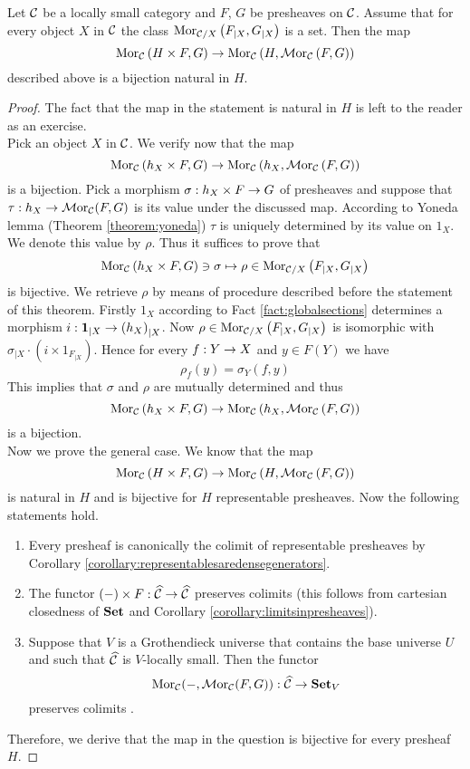 \begin{theorem}\label{theorem:internalhomforpresheaves}
Let ${\mathcal C}$ be a locally small category and $F$, $G$ be presheaves on ${\mathcal C}$. Assume that for every object $X$ in ${\mathcal C}$ the class $\mathrm{Mor}_{{\mathcal C}/X}\left(F_{\mid X},G_{\mid X}\right)$ is a set. Then the map 
$$\mathrm{Mor}_{{\mathcal C}}\left(H\times F,G\right)\rightarrow  \mathrm{Mor}_{{\mathcal C}}\left(H,\mathcal{M}\mathrm{or}_{{\mathcal C}}\left(F,G\right)\right)$$
described above is a bijection natural in $H$. 
\end{theorem}
\begin{proof}
The fact that the map in the statement is natural in $H$ is left to the reader as an exercise.\\
Pick an object $X$ in ${\mathcal C}$. We verify now that the map
$$\mathrm{Mor}_{{\mathcal C}}\left(h_X\times F,G\right)\rightarrow  \mathrm{Mor}_{{\mathcal C}}\left(h_X,\mathcal{M}\mathrm{or}_{{\mathcal C}}\left(F,G\right)\right)$$
is a bijection. Pick a morphism $\sigma:h_X\times F\rightarrow G$ of presheaves and suppose that $\tau:h_X\rightarrow \mathcal{M}\mathrm{or}_{{\mathcal C}}(F,G)$ is its value under the discussed map. According to Yoneda lemma (Theorem \ref{theorem:yoneda}) $\tau$ is uniquely determined by its value on $1_X$. We denote this value by $\rho$. Thus it suffices to prove that 
$$\mathrm{Mor}_{{\mathcal C}}\left(h_X\times F,G\right)\ni \sigma \mapsto \rho \in \mathrm{Mor}_{{\mathcal C}/X}\left(F_{\mid X},G_{\mid X}\right)$$
is bijective. We retrieve $\rho$ by means of procedure described before the statement of this theorem. Firstly $1_X$ according to Fact \ref{fact:globalsections} determines a morphism $i:\mathbf{1}_{\mid X}\rightarrow \left(h_X\right)_{\mid X}$. Now $\rho\in \mathrm{Mor}_{{\mathcal C}/X}\left(F_{\mid X},G_{\mid X}\right)$ is isomorphic with $\sigma_{\mid X}\cdot \left(i\times 1_{F_{\mid X}}\right)$. Hence for every $f:Y\rightarrow X$ and $y\in F(Y)$ we have 
$$\rho_f(y) = \sigma_Y(f,y)$$
This implies that $\sigma$ and $\rho$ are mutually determined and thus
$$\mathrm{Mor}_{{\mathcal C}}\left(h_X\times F,G\right)\rightarrow  \mathrm{Mor}_{{\mathcal C}}\left(h_X,\mathcal{M}\mathrm{or}_{{\mathcal C}}\left(F,G\right)\right)$$
is a bijection.\\
Now we prove the general case. We know that the map
$$\mathrm{Mor}_{{\mathcal C}}\left(H\times F,G\right)\rightarrow  \mathrm{Mor}_{{\mathcal C}}\left(H,\mathcal{M}\mathrm{or}_{{\mathcal C}}\left(F,G\right)\right)$$
is natural in $H$ and is bijective for $H$ representable presheaves. Now the following statements hold.
\begin{enumerate}[label=\textbf{(\arabic*)}, leftmargin=1.5em]
\item Every presheaf is canonically the colimit of representable presheaves by Corollary \ref{corollary:representablesaredensegenerators}.
\item The functor $(-)\times F:\widehat{{\mathcal C}}\rightarrow \widehat{{\mathcal C}}$ preserves colimits (this follows from cartesian closedness of $\mathbf{Set}$ {\cite[page 98]{Maclane}} and Corollary \ref{corollary:limitsinpresheaves}).
\item Suppose that $V$ is a Grothendieck universe that contains the base universe $U$ and such that $\widehat{{\mathcal C}}$ is $V$-locally small. Then the functor
$$\mathrm{Mor}_{{\mathcal C}}(-,\mathcal{M}\mathrm{or}_{{\mathcal C}}(F,G)):\widehat{{\mathcal C}}\rightarrow \mathbf{Set}_V$$
preserves colimits {\cite[V.4, Theorem 1]{Maclane}}.
\end{enumerate}
Therefore, we derive that the map in the question is bijective for every presheaf $H$.
\end{proof}

